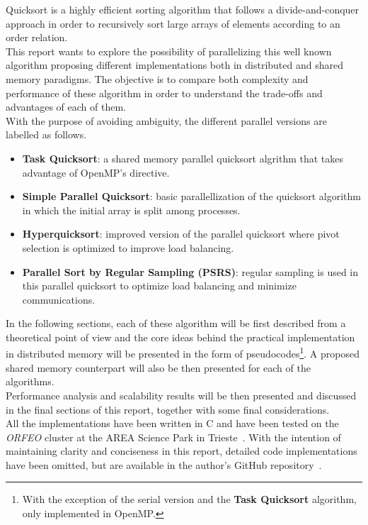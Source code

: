 \documentclass[../main.tex]{subfiles}
\begin{document}
Quicksort is a highly efficient sorting algorithm that follows a divide-and-conquer approach in order to recursively sort large arrays of elements according to an order relation.\\
This report wants to explore the possibility of parallelizing this well known algorithm proposing different implementations both in distributed and shared memory paradigms. 
The objective is to compare both complexity and performance of these algorithm
in order to understand the trade-offs and advantages of each of them.\\
With the purpose of avoiding ambiguity, the different parallel versions are labelled as follows.

\begin{itemize}
    \item \textbf{Task Quicksort}: a shared memory parallel quicksort algrithm that takes advantage of OpenMP's  directive.
    \item \textbf{Simple Parallel Quicksort}: basic parallellization of the quicksort algorithm in which the initial array is split among processes.
    \item \textbf{Hyperquicksort}: improved version of the parallel quicksort where pivot selection is optimized to improve load balancing.
    \item \textbf{Parallel Sort by Regular Sampling (PSRS)}: regular sampling is used in this parallel quicksort to optimize load balancing and minimize communications.
\end{itemize}

In the following sections, each of these algorithm will be first described from
a theoretical point of view and the core ideas behind the practical
implementation in distributed memory will be presented in the form of
pseudocodes\footnote{With the exception of the serial version and the \textbf{Task Quicksort} algorithm, only implemented in OpenMP.}. A proposed shared
memory counterpart will also be then presented for each of the algorithms.\\
Performance analysis and scalability results will be then presented and discussed in the final sections of this report, together with some final considerations.\\
All the implementations have been written in C and have been tested on the \textit{ORFEO} cluster at the AREA Science Park in Trieste~\cite{orfeo}. With the intention of maintaining clarity and conciseness in this report, detailed code implementations have been omitted, but are available in the author's GitHub repository~\cite{github}.\\
\end{document}
